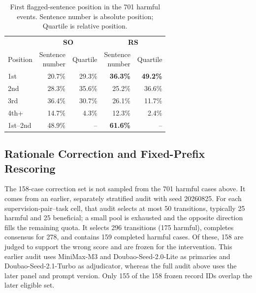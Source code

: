 \begin{table}[!tp]
\centering
\captionsetup{font=normalsize,skip=2pt}
\small
\setlength{\tabcolsep}{8pt}
\renewcommand{\arraystretch}{1.05}

\begin{tabular}{@{}lrrrr@{}}
\toprule
& \multicolumn{2}{c}{\textbf{SO}}
& \multicolumn{2}{c}{\textbf{RS}} \\
\cmidrule(lr){2-3}\cmidrule(lr){4-5}
Position
& \shortstack{Sentence\\number}
& Quartile
& \shortstack{Sentence\\number}
& Quartile \\
\midrule

1st
& 20.7\% & 29.3\%
& \textbf{36.3\%} & \textbf{49.2\%} \\

2nd
& 28.3\% & 35.6\%
& 25.2\% & 36.6\% \\

3rd
& 36.4\% & 30.7\%
& 26.1\% & 11.7\% \\

4th+
& 14.7\% & 4.3\%
& 12.3\% & 2.4\% \\

1st--2nd
& 48.9\% & --
& \textbf{61.6\%} & -- \\

\bottomrule
\end{tabular}

\caption{First flagged-sentence position in the 701 harmful events.
Sentence number is absolute position; Quartile is relative position.}
\label{tab:full-first-error-position}
\end{table}

\subsection{Rationale Correction and Fixed-Prefix Rescoring}

The 158-case correction set is not sampled from the 701 harmful cases above.
It comes from an earlier, separately stratified audit with seed 20260825. For
each supervision-pair--task cell, that audit selects at most 50 transitions,
typically 25 harmful and 25 beneficial; a small pool is exhausted and the
opposite direction fills the remaining quota. It selects 296 transitions
(175 harmful), completes consensus for 278, and contains 159 completed harmful
cases. Of these, 158 are judged to support the wrong score and are frozen for
the intervention. This earlier audit uses MiniMax-M3 and
Doubao-Seed-2.0-Lite as primaries and Doubao-Seed-2.1-Turbo as adjudicator,
whereas the full audit above uses the later panel and prompt version.
Only 155 of the 158 frozen record IDs overlap the later eligible set.


